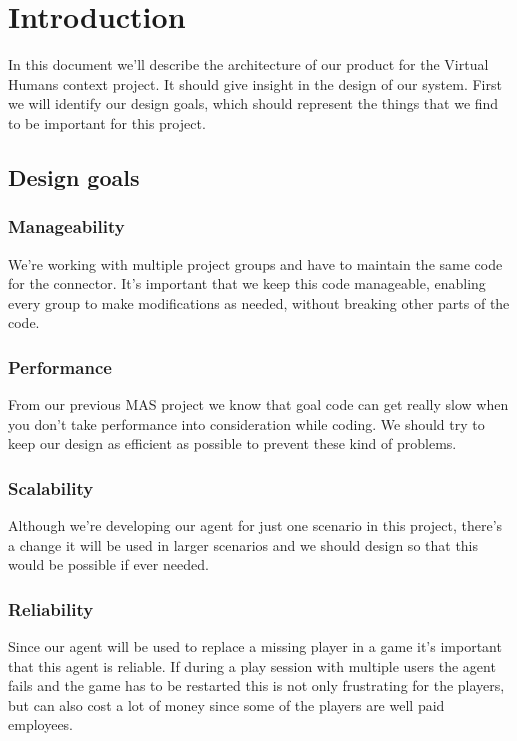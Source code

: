 \section{Introduction}

In this document we’ll describe the architecture of our product for the Virtual Humans context project. It should give insight in the design of our system. First we will identify our design goals, which should represent the things that we find to be important for this project.


\subsection{Design goals}

\subsubsection*{Manageability}
We’re working with multiple project groups and have to maintain the same code for the connector. It’s important that we keep this code manageable, enabling every group to make modifications as needed, without breaking other parts of the code.

\subsubsection*{Performance}
From our previous MAS project we know that goal code can get really slow when you don’t take performance into consideration while coding. We should try to keep our design as efficient as possible to prevent these kind of problems.

\subsubsection*{Scalability}
Although we’re developing our agent for just one scenario in this project, there’s a change it will be used in larger scenarios and we should design so that this would be possible if ever needed.

\subsubsection*{Reliability}
Since our agent will be used to replace a missing player in a game it’s important that this agent is  reliable. If during a play session with multiple users the agent fails and the game has to be restarted this is not only frustrating for the players, but can also cost a lot of money since some of the players are well paid employees.

